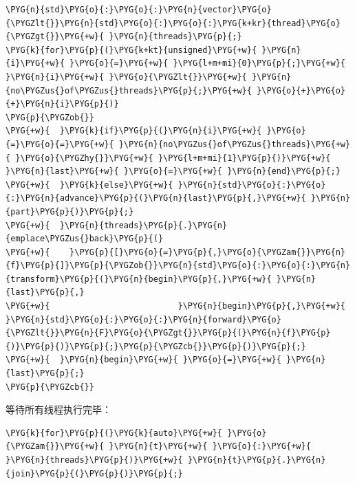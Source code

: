 \begin{codeblockbg}
\begin{Verbatim}[commandchars=\\\{\},breaklines=true,breakanywhere=true,fontsize=\codefont,xleftmargin=17bp]
\PYG{n}{std}\PYG{o}{:}\PYG{o}{:}\PYG{n}{vector}\PYG{o}{\PYGZlt{}}\PYG{n}{std}\PYG{o}{:}\PYG{o}{:}\PYG{k+kr}{thread}\PYG{o}{\PYGZgt{}}\PYG{+w}{ }\PYG{n}{threads}\PYG{p}{;}
\PYG{k}{for}\PYG{p}{(}\PYG{k+kt}{unsigned}\PYG{+w}{ }\PYG{n}{i}\PYG{+w}{ }\PYG{o}{=}\PYG{+w}{ }\PYG{l+m+mi}{0}\PYG{p}{;}\PYG{+w}{ }\PYG{n}{i}\PYG{+w}{ }\PYG{o}{\PYGZlt{}}\PYG{+w}{ }\PYG{n}{no\PYGZus{}of\PYGZus{}threads}\PYG{p}{;}\PYG{+w}{ }\PYG{o}{+}\PYG{o}{+}\PYG{n}{i}\PYG{p}{)}
\PYG{p}{\PYGZob{}}
\PYG{+w}{  }\PYG{k}{if}\PYG{p}{(}\PYG{n}{i}\PYG{+w}{ }\PYG{o}{=}\PYG{o}{=}\PYG{+w}{ }\PYG{n}{no\PYGZus{}of\PYGZus{}threads}\PYG{+w}{ }\PYG{o}{\PYGZhy{}}\PYG{+w}{ }\PYG{l+m+mi}{1}\PYG{p}{)}\PYG{+w}{ }\PYG{n}{last}\PYG{+w}{ }\PYG{o}{=}\PYG{+w}{ }\PYG{n}{end}\PYG{p}{;}
\PYG{+w}{  }\PYG{k}{else}\PYG{+w}{ }\PYG{n}{std}\PYG{o}{:}\PYG{o}{:}\PYG{n}{advance}\PYG{p}{(}\PYG{n}{last}\PYG{p}{,}\PYG{+w}{ }\PYG{n}{part}\PYG{p}{)}\PYG{p}{;}
\PYG{+w}{  }\PYG{n}{threads}\PYG{p}{.}\PYG{n}{emplace\PYGZus{}back}\PYG{p}{(}
\PYG{+w}{    }\PYG{p}{[}\PYG{o}{=}\PYG{p}{,}\PYG{o}{\PYGZam{}}\PYG{n}{f}\PYG{p}{]}\PYG{p}{\PYGZob{}}\PYG{n}{std}\PYG{o}{:}\PYG{o}{:}\PYG{n}{transform}\PYG{p}{(}\PYG{n}{begin}\PYG{p}{,}\PYG{+w}{ }\PYG{n}{last}\PYG{p}{,}
\PYG{+w}{                          }\PYG{n}{begin}\PYG{p}{,}\PYG{+w}{ }\PYG{n}{std}\PYG{o}{:}\PYG{o}{:}\PYG{n}{forward}\PYG{o}{\PYGZlt{}}\PYG{n}{F}\PYG{o}{\PYGZgt{}}\PYG{p}{(}\PYG{n}{f}\PYG{p}{)}\PYG{p}{)}\PYG{p}{;}\PYG{p}{\PYGZcb{}}\PYG{p}{)}\PYG{p}{;}
\PYG{+w}{  }\PYG{n}{begin}\PYG{+w}{ }\PYG{o}{=}\PYG{+w}{ }\PYG{n}{last}\PYG{p}{;}
\PYG{p}{\PYGZcb{}}
\end{Verbatim}
\end{codeblockbg}



等待所有线程执行完毕：



\begin{codeblockbg}
\begin{Verbatim}[commandchars=\\\{\},breaklines=true,breakanywhere=true,fontsize=\codefont,xleftmargin=17bp]
\PYG{k}{for}\PYG{p}{(}\PYG{k}{auto}\PYG{+w}{ }\PYG{o}{\PYGZam{}}\PYG{+w}{ }\PYG{n}{t}\PYG{+w}{ }\PYG{o}{:}\PYG{+w}{ }\PYG{n}{threads}\PYG{p}{)}\PYG{+w}{ }\PYG{n}{t}\PYG{p}{.}\PYG{n}{join}\PYG{p}{(}\PYG{p}{)}\PYG{p}{;}
\end{Verbatim}
\end{codeblockbg}


